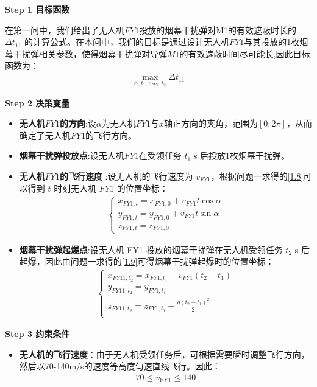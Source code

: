 \documentclass[../main.tex]{subfiles}
\begin{document}
\noindent \textbf{Step 1 目标函数}
\par 在第一问中，我们给出了无人机$FY1$投放的烟幕干扰弹对M1的有效遮蔽时长的$\Delta t_{11}$ 的计算公式。在本问中，我们的目标是通过设计无人机$FY1$与其投放的1枚烟幕干扰弹相关参数，使得烟幕干扰弹对导弹$M1$的有效遮蔽时间尽可能长,因此目标函数为：
\begin{align}\label{10.1}
  \underset{\alpha ,t_1,v_{FY1},t_2}{\max}\Delta t_{11}
\end{align}



\noindent \textbf{Step 2 决策变量}

\begin{itemize}
\item \textbf{无人机$FY1$的方向}:设$\alpha $为无人机$FY1$与$x$轴正方向的夹角，范围为$\left[ 0,2\pi \right] $，从而确定了无人机$FY1$的飞行方向。
\item \textbf{烟幕干扰弹投放点}:设无人机$FY1$在受领任务 \( t_1 \) s 后投放1枚烟幕干扰弹。
\item  \textbf{无人机$FY1$的飞行速度} :设无人机的飞行速度为 \( v_{FY1} \)，根据问题一求得的\eqref{1.8}可以得到 \( t \) 时刻无人机 \( FY1 \) 的位置坐标：
\begin{align}\label{10.3}
  \begin{cases}
x_{FY1,t} = x_{FY1,0} + v_{FY1} t \cos\alpha \\
y_{FY1,t} = y_{FY1,0} + v_{FY1} t \sin\alpha \\
z_{FY1,t} = z_{FY1,0}
\end{cases}
\end{align}
\item \textbf{烟幕干扰弹起爆点}:设无人机 FY1 投放的烟幕干扰弹在无人机受领任务 \( t_2 \) s 后起爆，因此由问题一求得的\eqref{1.9}可得烟幕干扰弹起爆时的位置坐标：
\begin{align}\label{10.4}
    \left\{ \begin{array}{l}
	x_{FY11,t_2}=x_{FY1,t_1}-v_{FY1}\left( t_2-t_1 \right)\\
	y_{FY11,t_2}=y_{FY1,t_1}\\
	z_{FY11,t_2}=z_{FY1,t_1}-\frac{g\left( t_2-t_1 \right) ^2}{2}\\
\end{array} \right. 
\end{align}
\end{itemize}



\noindent \textbf{Step 3 约束条件}
\begin{itemize}
\item \textbf{无人机的飞行速度}：由于无人机受领任务后，可根据需要瞬时调整飞行方向，然后以70-140m/s的速度等高度匀速直线飞行。因此：
\begin{align}\label{10.8}
  70 \leq v_{\text{FY1}} \leq 140
\end{align}
\end{itemize}
\end{document}
